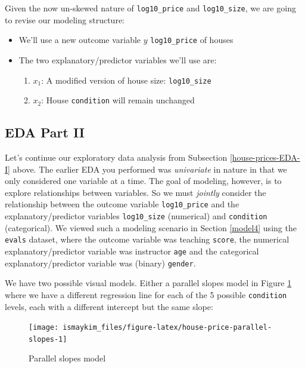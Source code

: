 \documentclass[12pt,]{krantz}
\providecommand{\tightlist}{%
  \setlength{\itemsep}{0pt}\setlength{\parskip}{0pt}}
\theoremstyle{definition}
\theoremstyle{definition}
\theoremstyle{definition}
\theoremstyle{remark}
\begin{document}
Given the now un-skewed nature of \texttt{log10\_price} and
\texttt{log10\_size}, we are going to revise our modeling structure:

\begin{itemize}
\tightlist
\item
  We'll use a new outcome variable \(y\) \texttt{log10\_price} of houses
\item
  The two explanatory/predictor variables we'll use are:

  \begin{enumerate}
  \def\labelenumi{\arabic{enumi}.}
  \tightlist
  \item
    \(x_1\): A modified version of house size: \texttt{log10\_size}
  \item
    \(x_2\): House \texttt{condition} will remain unchanged
  \end{enumerate}
\end{itemize}

\subsection{EDA Part II}\label{eda-part-ii}

Let's continue our exploratory data analysis from Subsection
\ref{house-prices-EDA-I} above. The earlier EDA you performed was
\emph{univariate} in nature in that we only considered one variable at a
time. The goal of modeling, however, is to explore relationships between
variables. So we must \emph{jointly} consider the relationship between
the outcome variable \texttt{log10\_price} and the explanatory/predictor
variables \texttt{log10\_size} (numerical) and \texttt{condition}
(categorical). We viewed such a modeling scenario in Section
\ref{model4} using the \texttt{evals} dataset, where the outcome
variable was teaching \texttt{score}, the numerical
explanatory/predictor variable was instructor \texttt{age} and the
categorical explanatory/predictor variable was (binary) \texttt{gender}.

We have two possible visual models. Either a parallel slopes model in
Figure \ref{fig:house-price-parallel-slopes} where we have a different
regression line for each of the 5 possible \texttt{condition} levels,
each with a different intercept but the same slope:

\begin{figure}

{\centering \texttt{[image: ismaykim\_files/figure-latex/house-price-parallel-slopes-1]} 

}

\caption{Parallel slopes model}\label{fig:house-price-parallel-slopes}
\end{figure}
\end{document}
